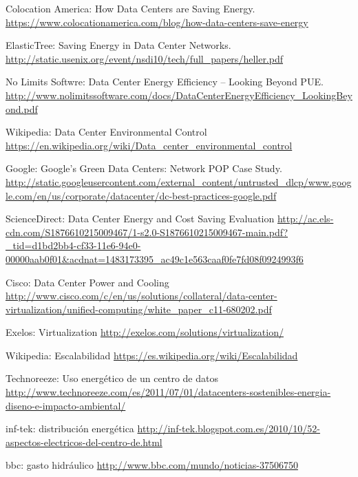\documentclass[10pt]{article}
\begin{document}
\begin{thebibliography}{9}
		Colocation America: How Data Centers are Saving Energy. \newline
		\url{https://www.colocationamerica.com/blog/how-data-centers-save-energy}

		ElasticTree: Saving Energy in Data Center Networks. \newline
		\url{http://static.usenix.org/event/nsdi10/tech/full_papers/heller.pdf}

		No Limits Softwre: Data Center Energy Efficiency – Looking Beyond PUE. \newline
		\url{http://www.nolimitssoftware.com/docs/DataCenterEnergyEfficiency_LookingBeyond.pdf}

		Wikipedia: Data Center Environmental Control \newline
		\url{https://en.wikipedia.org/wiki/Data_center_environmental_control}

		Google: Google’s Green Data Centers: Network POP Case Study.\newline
		\url{http://static.googleusercontent.com/external_content/untrusted_dlcp/www.google.com/en/us/corporate/datacenter/dc-best-practices-google.pdf}

		ScienceDirect: Data Center Energy and Cost Saving Evaluation \newline
		\url{http://ac.els-cdn.com/S1876610215009467/1-s2.0-S1876610215009467-main.pdf?_tid=d1bd2bb4-cf33-11e6-94e0-00000aab0f01&acdnat=1483173395_ac49c1e563caaf0fe7fd08f0924993f6}

		Cisco: Data Center Power and Cooling \newline
		\url{http://www.cisco.com/c/en/us/solutions/collateral/data-center-virtualization/unified-computing/white_paper_c11-680202.pdf}

		Exelos: Virtualization \newline
		\url{http://exelos.com/solutions/virtualization/}

		Wikipedia: Escalabilidad \newline
		\url{https://es.wikipedia.org/wiki/Escalabilidad}

		Technoreeze: Uso energético de un centro de datos \newline
		\url{http://www.technoreeze.com/es/2011/07/01/datacenters-sostenibles-energia-diseno-e-impacto-ambiental/}
        
        inf-tek: distribución energética \newline
        \url{http://inf-tek.blogspot.com.es/2010/10/52-aspectos-electricos-del-centro-de.html}
        
        bbc: gasto hidráulico \newline
        \url{http://www.bbc.com/mundo/noticias-37506750}
        
        
        
	\end{thebibliography}
\end{document}
